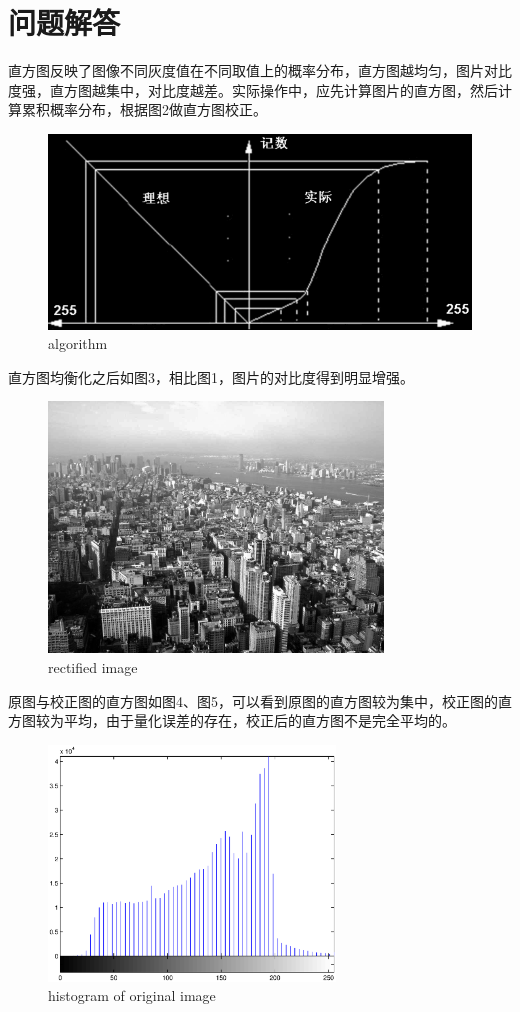 \documentclass[UTF8]{ctexart}
\begin{document}
\section{问题解答}
直方图反映了图像不同灰度值在不同取值上的概率分布，直方图越均匀，图片对比度强，直方图越集中，对比度越差。实际操作中，应先计算图片的直方图，然后计算累积概率分布，根据图2做直方图校正。\par
\begin{figure}[htbp]
\centerline{\includegraphics[width=4.5in]{prin.jpg}}
\caption[]{algorithm}
\end{figure}\par
直方图均衡化之后如图3，相比图1，图片的对比度得到明显增强。\par
\begin{figure}[htbp]
\centerline{\includegraphics[width=3.5in]{rect.jpg}}
\caption[]{rectified image}
\end{figure}\par
原图与校正图的直方图如图4、图5，可以看到原图的直方图较为集中，校正图的直方图较为平均，由于量化误差的存在，校正后的直方图不是完全平均的。\par
\begin{figure}[htbp]
\centerline{\includegraphics[width=3in]{raw.eps}}
\caption[]{histogram of original image}
\end{figure}\par
\end{document}
